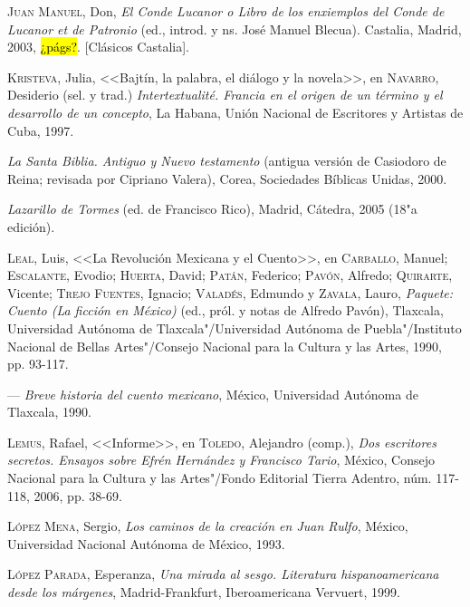 \documentclass[14pt,twoside,final]{extbook} %
\begin{document}
\textsc{Juan Manuel}, Don, \emph{El Conde Lucanor o Libro de los enxiemplos del Conde de Lucanor et de Patronio} (ed., introd. y ns. José Manuel Blecua). Castalia, Madrid, 2003, \hl{¿págs?}. [Clásicos Castalia].\label{bib:juanmanuel2003}

\textsc{Kristeva}, Julia, <<Bajtín, la palabra, el diálogo y la novela>>, en \textsc{Navarro}, Desiderio (sel. y trad.) \emph{Intertextualité. Francia en el origen de un término y el desarrollo de un concepto}, La Habana, Unión Nacional de Escritores y Artistas de Cuba, 1997.\label{bib:kristeva1997}

\emph{La Santa Biblia. Antiguo y Nuevo testamento} (antigua versión de Casiodoro de Reina; revisada por Cipriano Valera), Corea, Sociedades Bíblicas Unidas, 2000.\label{bib:biblia2000}

\emph{Lazarillo de Tormes} (ed. de Francisco Rico), Madrid, Cátedra, 2005 (18"a edición).\label{bib:lazarillo2005}

\textsc{Leal}, Luis, <<La Revolución Mexicana y el Cuento>>, en \textsc{Carballo}, Manuel; \textsc{Escalante}, Evodio; \textsc{Huerta}, David; \textsc{Patán}, Federico; \textsc{Pavón}, Alfredo; \textsc{Quirarte}, Vicente; \textsc{Trejo Fuentes}, Ignacio; \textsc{Valadés}, Edmundo y \textsc{Zavala}, Lauro, \emph{Paquete: Cuento (La ficción en México)} (ed., pról. y notas de Alfredo Pavón), Tlaxcala, Universidad Autónoma de Tlaxcala"/Universidad Autónoma de Puebla"/Instituto Nacional de Bellas Artes"/Consejo Nacional para la Cultura y las Artes, 1990, pp. 93-117.\label{bib:leal1990a}

--- \emph{Breve historia del cuento mexicano}, México, Universidad Autónoma de Tlaxcala, 1990.\label{bib:leal1990b}

\textsc{Lemus}, Rafael, <<Informe>>, en \textsc{Toledo}, Alejandro (comp.), \emph{Dos escritores secretos. Ensayos sobre Efrén Hernández y Francisco Tario}, México, Consejo Nacional para la Cultura y las Artes"/Fondo Editorial Tierra Adentro, núm. 117-118, 2006, pp. 38-69.\label{bib:lemus2006}

\textsc{López Mena}, Sergio, \emph{Los caminos de la creación en Juan Rulfo}, México, Universidad Nacional Autónoma de México, 1993.\label{bib:lopezmena1993}

\textsc{López Parada}, Esperanza, \emph{Una mirada al sesgo. Literatura hispanoamericana desde los márgenes}, Madrid-Frankfurt, Iberoamericana Vervuert, 1999.\label{bib:lopezparada1999}
\end{document}
